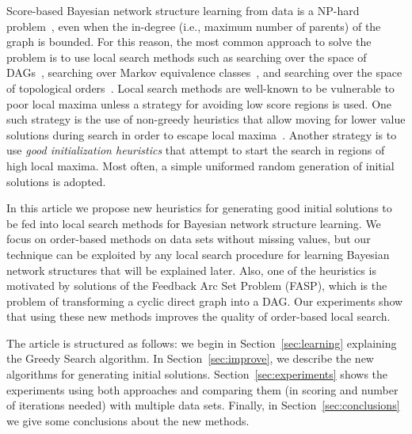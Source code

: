 Score-based Bayesian network structure learning from data is a NP-hard problem~\cite{MSResearch04}, even when the in-degree (i.e., maximum number of parents) of the graph is bounded. For this reason, the most common approach to solve the problem is to use local search methods such as searching over the space of DAGs~\cite{FNP99}, searching over Markov equivalence classes~\cite{Maxwell02}, and searching over the space of topological orders~\cite{TK05}. Local search methods are well-known to be vulnerable to poor local maxima unless a strategy for avoiding low score regions is used. One such strategy is the use of non-greedy heuristics that allow moving for lower value solutions during search in order to escape local maxima~\cite{ENF02}. Another strategy is to use \emph{good initialization heuristics} that attempt to start the search in regions of high local maxima. Most often, a simple uniformed random generation of initial solutions is adopted.

In this article we propose new heuristics for generating good initial solutions to be fed into local search methods for Bayesian network structure learning. We focus on order-based methods on data sets without missing values, but our technique can be exploited by any local search procedure for learning Bayesian network structures that will be explained later. Also, one of the heuristics is motivated by solutions of the Feedback Arc Set Problem (FASP), which is the problem of transforming a cyclic direct graph into a DAG. Our experiments show that using these new methods improves the quality of order-based local search.

The article is structured as follows: we begin in Section~\ref{sec:learning} explaining the Greedy Search algorithm. In Section~\ref{sec:improve}, we describe the new algorithms for generating initial solutions. Section~\ref{sec:experiments} shows the experiments using both approaches and comparing them (in scoring and number of iterations needed) with multiple data sets. Finally, in Section~\ref{sec:conclusions} we give
some conclusions about the new methods.
